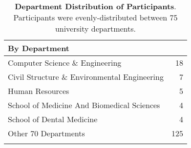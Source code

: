 \begin{table}[t]
{\small
  \begin{tabularx}{\columnwidth}{Xr}
        
    \textbf{By Department} &\\\toprule
    Computer Science \& Engineering & 18 \\
    Civil Structure \& Environmental Engineering & 7 \\
    Human Resources & 5 \\
    School of Medicine And Biomedical Sciences & 4 \\
    School of Dental Medicine & 4\\\midrule
    Other 70 Departments & 125\\\\

    \end{tabularx}
    }
    
    \caption{\textbf{Department Distribution of Participants}. Participants
    were evenly-distributed between 75 university departments.}
    
    \label{tab:demographic}
    \vspace*{-0.2in}
\end{table}
